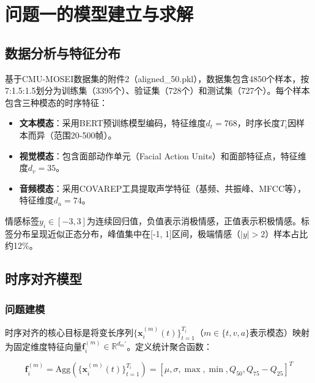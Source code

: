 \section{问题一的模型建立与求解}

\subsection{数据分析与特征分布}

基于CMU-MOSEI数据集的附件2（aligned\_50.pkl），数据集包含4850个样本，按7:1.5:1.5划分为训练集（3395个）、验证集（728个）和测试集（727个）。每个样本包含三种模态的时序特征：

\begin{itemize}
\item \textbf{文本模态}：采用BERT预训练模型编码，特征维度$d_t=768$，时序长度$T_i$因样本而异（范围20-500帧）。
\item \textbf{视觉模态}：包含面部动作单元（Facial Action Units）和面部特征点，特征维度$d_v=35$。
\item \textbf{音频模态}：采用COVAREP工具提取声学特征（基频、共振峰、MFCC等），特征维度$d_a=74$。
\end{itemize}

情感标签$y_i \in [-3, 3]$为连续回归值，负值表示消极情感，正值表示积极情感。标签分布呈现近似正态分布，峰值集中在[-1, 1]区间，极端情感（$|y|>2$）样本占比约12\%。

\subsection{时序对齐模型}

\subsubsection{问题建模}

时序对齐的核心目标是将变长序列$\{\mathbf{x}_i^{(m)}(t)\}_{t=1}^{T_i}$（$m \in \{t, v, a\}$表示模态）映射为固定维度特征向量$\mathbf{f}_i^{(m)} \in \mathbb{R}^{d_m'}$。定义统计聚合函数：

\begin{equation}
\mathbf{f}_i^{(m)} = \text{Agg}\left(\{\mathbf{x}_i^{(m)}(t)\}_{t=1}^{T_i}\right) = \left[\mu, \sigma, \max, \min, Q_{50}, Q_{75}-Q_{25}\right]^T
\end{equation}

